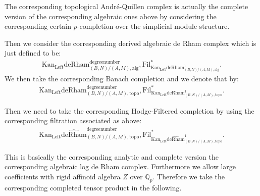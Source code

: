 \documentclass[11pt]{book}
\theoremstyle{definition}
\numberwithin{equation}{section}
\begin{document}
\indent The corresponding topological Andr\'e-Quillen complex is actually the complete version of the corresponding algebraic ones above by considering the corresponding certain $p$-completion over the simplicial module structure.







\indent Then we consider the corresponding derived algebraic de Rham complex which is just defined to be:
\begin{align}
\mathrm{Kan}_\mathrm{Left}\mathrm{deRham}^\text{degreenumber}_{(B,N)/(A,M),\mathrm{alg}},\mathrm{Fil}^*_{\mathrm{Kan}_\mathrm{Left}\mathrm{deRham}^1_{(B,N)/(A,M),\mathrm{alg}}}.	
\end{align}
We then take the corresponding Banach completion and we denote that by:
\begin{align}
\mathrm{Kan}_\mathrm{Left}\mathrm{deRham}^\text{degreenumber}_{(B,N)/(A,M),\mathrm{topo}},\mathrm{Fil}^*_{\mathrm{Kan}_\mathrm{Left}\mathrm{deRham}^1_{(B,N)/(A,M),\mathrm{topo}}}.	
\end{align}



\indent Then we need to take the corresponding Hodge-Filtered completion by using the corresponding filtration associated as above:
\begin{align}
\mathrm{Kan}_\mathrm{Left}\widehat{\mathrm{deRham}}^\text{degreenumber}_{(B,N)/(A,M),\mathrm{topo}},\mathrm{Fil}^*_{\mathrm{Kan}_\mathrm{Left}\widehat{\mathrm{deRham}}^1_{(B,N)/(A,M),\mathrm{topo}}}.	
\end{align}


This is basically the corresponding analytic and complete version the corresponding algebraic log de Rham complex. Furthermore we allow large coefficients with rigid affinoid algebra $Z$ over $\mathbb{Q}_p$. Therefore we take the corresponding completed tensor product in the following.
\end{document}
